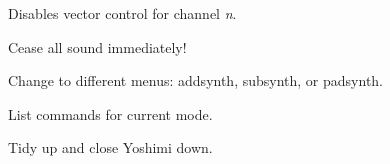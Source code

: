       Disables vector control for channel \textsl{n}.

      Cease all sound immediately!

      Change to different menus: addsynth, subsynth, or padsynth.

      List commands for current mode.

         Tidy up and close Yoshimi down.

